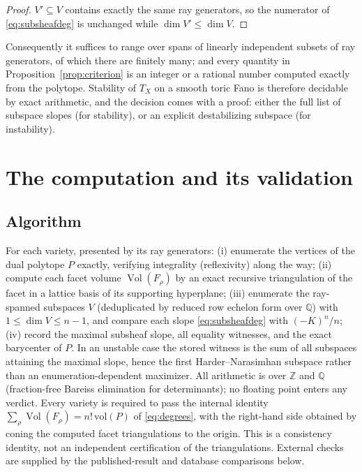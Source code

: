 \documentclass[11pt]{amsart}
\theoremstyle{definition}
\theoremstyle{remark}
\newcommand{\ZZ}{\mathbb{Z}}
\newcommand{\QQ}{\mathbb{Q}}
\newcommand{\Vol}{\operatorname{Vol}}
\begin{document}
\begin{proof}
$V' \subseteq V$ contains exactly the same ray generators, so the
numerator of \eqref{eq:subsheafdeg} is unchanged while
$\dim V' \le \dim V$.
\end{proof}

Consequently it suffices to range over spans of linearly independent
subsets of ray generators, of which there are finitely many; and every
quantity in Proposition~\ref{prop:criterion} is an integer or a rational
number computed exactly from the polytope. Stability of $T_X$ on a
smooth toric Fano is therefore decidable by exact arithmetic, and the
decision comes with a proof: either the full list of subspace slopes
(for stability), or an explicit destabilizing subspace (for
instability).

\section{The computation and its validation}\label{sec:harness}

\subsection{Algorithm}
For each variety, presented by its ray generators: (i) enumerate the
vertices of the dual polytope $P$ exactly, verifying integrality
(reflexivity) along the way; (ii) compute each facet volume
$\Vol(F_\rho)$ by an exact recursive triangulation of the facet in a
lattice basis of its supporting hyperplane; (iii) enumerate the
ray-spanned subspaces $V$ (deduplicated by reduced row echelon form over
$\QQ$) with $1 \le \dim V \le n-1$, and compare each slope
\eqref{eq:subsheafdeg} with $(-K)^n/n$; (iv) record the maximal subsheaf
slope, all equality witnesses, and the exact barycenter of $P$. In an unstable
case the stored witness is the sum of all subspaces attaining the maximal
slope, hence the first Harder--Narasimhan subspace rather than an
enumeration-dependent maximizer. All arithmetic is over $\ZZ$ and $\QQ$
(fraction-free Bareiss elimination for determinants); no floating point
enters any verdict. Every variety is required to pass the internal
identity $\sum_\rho \Vol(F_\rho) = n!\,\mathrm{vol}(P)$ of
\eqref{eq:degrees}, with the right-hand side obtained by coning the computed
facet triangulations to the origin. This is a consistency identity, not an
independent certification of the triangulations. External checks are supplied
by the published-result and database comparisons below.
\end{document}
